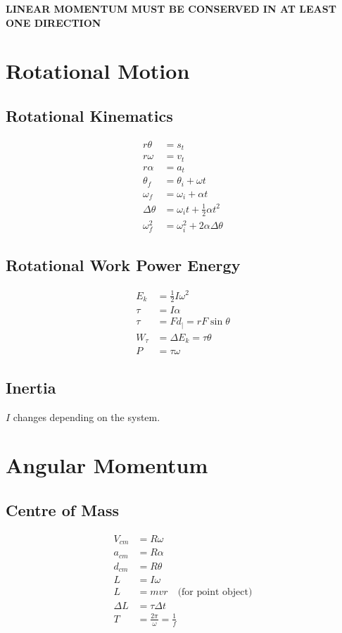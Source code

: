 \documentclass[letterpaper,10pt]{article}
\begin{document}
\begin{multicols}{2}
\medskip
\begin{center}
    \textbf{LINEAR MOMENTUM MUST BE CONSERVED IN AT LEAST ONE DIRECTION}
\end{center}

\section{Rotational Motion}
\subsection{Rotational Kinematics}
\begin{align*}
    r \theta &= s_t \\
    r \omega &= v_t \\
    r \alpha &= a_t \\
    \theta_f &= \theta_i + \omega t \\
    \omega_f &= \omega_i + \alpha t \\
    \Delta \theta &= \omega_i t + \tfrac{1}{2} \alpha t^2 \\
    \omega_f^2 &= \omega_i^2 + 2 \alpha \Delta \theta
\end{align*}

\subsection{Rotational Work Power Energy}
\begin{align*}
    E_k &= \tfrac{1}{2} I \omega^2 \\
    \tau &= I \alpha \\
    \tau &= F d_| = r F \sin \theta \\
    W_\tau &= \Delta E_k = \tau \theta \\
    P &= \tau \omega
\end{align*}

\subsection{Inertia}
$I$ changes depending on the system.


\section{Angular Momentum}
\subsection{Centre of Mass}
\begin{align*}
    V_{cm} &= R \omega \\
    a_{cm} &= R \alpha \\
    d_{cm} &= R \theta \\
    L &= I \omega \\
    L &= mvr \quad \textrm{(for point object)} \\
    \Delta L &= \tau \Delta t \\
    T &= \frac{2 \pi}{\omega} = \frac{1}{f}
\end{align*}


\end{multicols}
\end{document}
